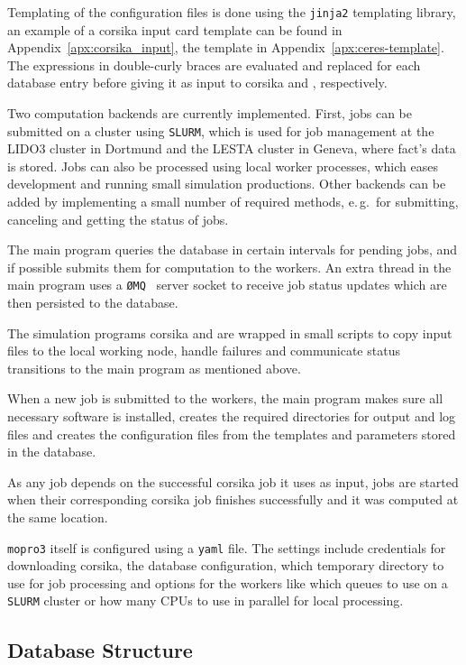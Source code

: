 Templating of the configuration files is done using the \texttt{jinja2} templating
library, an example of a \gls{corsika} input card template can be found in Appendix~\ref{apx:corsika_input}, the \ceres{} template in Appendix~\ref{apx:ceres-template}.
The expressions in double-curly braces are evaluated and replaced for each
database entry before giving it as input to \gls{corsika} and \ceres{}, respectively.

Two computation backends are currently implemented.
First, jobs can  be submitted
on a cluster using \texttt{SLURM}, which is used for job management
at the LIDO3 cluster in Dortmund and the LESTA cluster in Geneva, where \gls{fact}'s data
is stored.
Jobs can also be processed using local worker processes, which eases development
and running small simulation productions.
Other backends can be added by implementing a small number of required methods, e.\,g.\ for submitting, canceling and getting the status of jobs.

The main program queries the database in certain intervals for pending jobs,
and if possible submits them for computation to the workers.
An extra thread in the main program uses a \texttt{ØMQ}~\cite{zeroMQ} server socket
to receive job status updates which are then persisted to the database.

The simulation programs \gls{corsika} and \ceres{} are wrapped in small scripts to
copy input files to the local working node, handle failures and communicate
status transitions to the main program as mentioned above.

When a new job is submitted to the workers,
the main program makes sure all necessary software is installed, creates
the required directories for output and log files and
creates the configuration files from the templates and parameters stored
in the database.

As any \ceres{} job depends on the successful \gls{corsika} job it uses 
as input, \ceres{} jobs are started when their corresponding \gls{corsika}
job finishes successfully and it was computed at the same location.

\texttt{mopro3} itself is configured using a \texttt{yaml} file.
The settings include credentials for downloading \gls{corsika},
the database configuration, 
which temporary directory to use for job processing
and options for the workers like which queues to use on a \texttt{SLURM} cluster
or how many CPUs to use in parallel for local processing.

\subsection{Database Structure}

